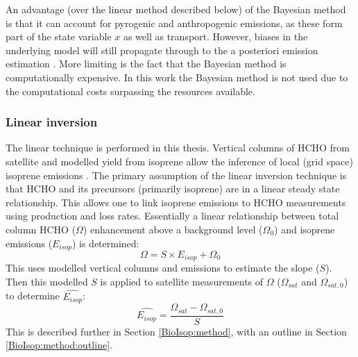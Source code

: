 \documentclass[acp, manuscript]{copernicus}
\newcommand{\parencite}{\citep}
\newcommand{\textcite}{\citet}
\begin{document}
An advantage (over the linear method described below) of the Bayesian method is that it can account for pyrogenic and anthropogenic emissions, as these form part of the state variable $x$ as well as transport.
However, biases in the underlying model will still propagate through to the a posteriori emission estimation \parencite{Curci2010}.
More limiting is the fact that the Bayesian method is computationally expensive. %
In this work the Bayesian method is not used due to the computational costs surpassing the resources available.

\subsubsection{Linear inversion}
\label{BioIsop:intro:top_down_linear}

The linear technique is performed in this thesis.
Vertical columns of HCHO from satellite and modelled yield from isoprene allow the inference of local (grid space) isoprene emissions \parencite{Palmer2003, Millet2006,Marais2012,Surl2018}.
The primary assumption of the linear inversion technique is that HCHO and its precursors (primarily isoprene) are in a linear steady state relationship.
This allows one to link isoprene emissions to HCHO measurements using production and loss rates.
Essentially a linear relationship between total column HCHO ($\Omega$) enhancement above a background level ($\Omega_0$) and isoprene emissions ($E_{isop}$) is determined:
\begin{equation*}
\Omega = S \times E_{isop} + \Omega_0
\end{equation*}
This uses modelled vertical columns and emissions to estimate the slope ($S$).
Then this modelled $S$ is applied to satellite measurements of $\Omega$ ($\Omega_{sat}$ and $\Omega_{sat,0}$) to determine $\hat{E_{isop}}$:
\begin{equation*}
\hat{E_{isop}} = \frac{\Omega_{sat} - \Omega_{sat,0}}{S}
\end{equation*}
This is described further in Section \ref{BioIsop:method}, with an outline in Section \ref{BioIsop:method:outline}.
\end{document}
